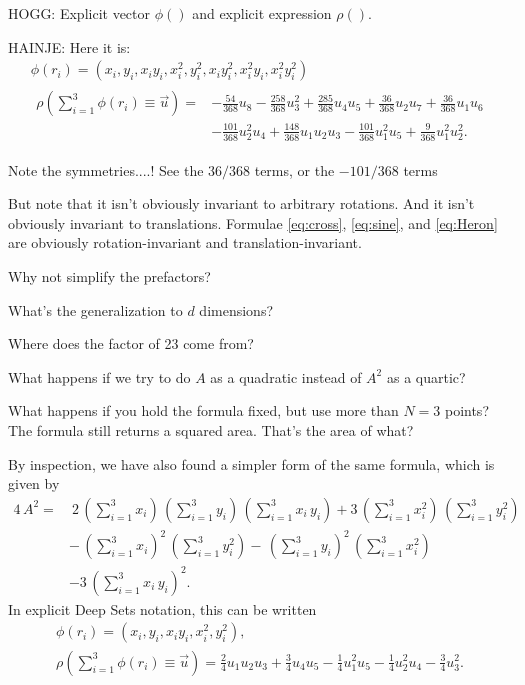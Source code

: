 \documentclass[12pt]{article}
\begin{document}
HOGG: Explicit vector $\phi()$ and explicit expression $\rho()$.

HAINJE: Here it is:
\begin{gather}
    \phi(r_i) = (x_i, y_i, x_iy_i, x_i^2, y_i^2, x_i y_i^2, x_i^2 y_i, x_i^2 y_i^2) \\
    \begin{aligned}
    \rho(\textstyle\sum_{i=1}^{3}\phi(r_i)\equiv \vec{u}) = &
    - \tfrac{54}{368} u_8
    - \tfrac{258}{368} u_3^2
    + \tfrac{285}{368} u_4 u_5
    + \tfrac{36}{368} u_2 u_7
    + \tfrac{36}{368} u_1 u_6 \\ &
    - \tfrac{101}{368} u_2^2 u_4
    + \tfrac{148}{368} u_1 u_2 u_3
    - \tfrac{101}{368} u_1^2 u_5
    + \tfrac{9}{368} u_1^2 u_2^2.
    \end{aligned}
\end{gather}

Note the symmetries....! See the $36/368$ terms, or the $-101/368$ terms

But note that it isn't obviously invariant to arbitrary rotations.
And it isn't obviously invariant to translations.
Formulae \eqref{eq:cross}, \eqref{eq:sine}, and \eqref{eq:Heron} are obviously rotation-invariant and translation-invariant.

Why not simplify the prefactors?

What's the generalization to $d$ dimensions?

Where does the factor of 23 come from?

What happens if we try to do $A$ as a quadratic instead of $A^2$ as a quartic?

What happens if you hold the formula fixed, but use more than $N=3$ points?
The formula still returns a squared area.
That's the area of what?

\newpage
By inspection, we have also found a simpler form of the same formula, which is given by
\begin{align}
    4 \, A^2 = & \
        2 \, (\sum_{i=1}^{3} x_i ) \, (\sum_{i=1}^{3} y_i ) \, (\sum_{i=1}^{3} x_i \, y_i )
        + 3 \, (\sum_{i=1}^{3} x_i^2 ) \, (\sum_{i=1}^{3} y_i^2 ) \nonumber \\ &
        - \, (\sum_{i=1}^{3} x_i )^2 \, (\sum_{i=1}^{3} y_i^2 )
        - \, (\sum_{i=1}^{3} y_i )^2 \, (\sum_{i=1}^{3} x_i^2 ) \nonumber \\ &
        - 3 \, (\sum_{i=1}^{3} x_i \, y_i )^2.
\end{align}
In explicit Deep Sets notation, this can be written
\begin{gather}
    \phi(r_i) = (
        x_i,
        y_i,
        x_i y_i,
        x_i^2,
        y_i^2
    ), \\
    \rho(\textstyle\sum_{i=1}^{3} \phi(r_i) \equiv \vec{u})
    = \tfrac{2}{4} u_1 u_2 u_3
    + \tfrac{3}{4} u_4 u_5
    - \tfrac{1}{4} u_1^2 u_5
    - \tfrac{1}{4} u_2^2 u_4
    - \tfrac{3}{4} u_3^2.
\end{gather}
\end{document}
